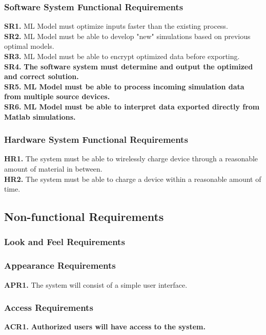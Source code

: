 \documentclass[12pt, titlepage]{article}
\begin{document}
\subsubsection{Software System Functional Requirements}
\textbf{SR1.} ML Model must optimize inputs faster than the existing process.\\
\textbf{SR2.} ML Model must be able to develop "new" simulations based on previous optimal models.\\
\textbf{SR3.} ML Model must be able to encrypt optimized data before exporting.\\
\textbf{SR4.} \textbf{The software system must determine and output the optimized and correct solution.}\\
\textbf{SR5.} \textbf{ML Model must be able to process incoming simulation data from multiple source devices.}\\
\textbf{SR6.} \textbf{ML Model must be able to interpret data exported directly from Matlab simulations.}\\

\subsubsection{Hardware System Functional Requirements}
\textbf{HR1.} The system must be able to wirelessly charge device through a reasonable amount of material in between.\\
\textbf{HR2.} The system must be able to charge a device within a reasonable amount of time.\\

\subsection{Non-functional Requirements}
\subsubsection{Look and Feel Requirements}
\subsubsection{Appearance Requirements}
\textbf{APR1.} The system will consist of a simple user interface.
\subsubsection{Access Requirements}
\textbf{ACR1.} \textbf{Authorized users will have access to the system.}
\end{document}
